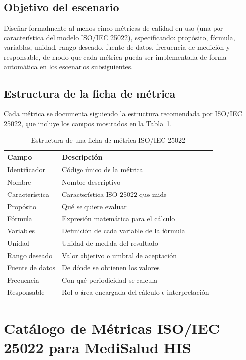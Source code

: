 \documentclass[12pt,a4paper]{article}
\begin{document}
\subsection{Objetivo del escenario}
Dise\~nar formalmente al menos cinco m\'etricas de calidad en uso (una por caracter\'istica del modelo ISO/IEC 25022), especificando: prop\'osito, f\'ormula, variables, unidad, rango deseado, fuente de datos, frecuencia de medici\'on y responsable, de modo que cada m\'etrica pueda ser implementada de forma autom\'atica en los escenarios subsiguientes.

\subsection{Estructura de la ficha de m\'etrica}
Cada m\'etrica se documenta siguiendo la estructura recomendada por ISO/IEC 25022, que incluye los campos mostrados en la Tabla~1.

\begin{table}[H]
\centering
\caption{Estructura de una ficha de m\'etrica ISO/IEC 25022}
\begin{tabularx}{\textwidth}{l X}
\toprule
\textbf{Campo} & \textbf{Descripci\'on} \\
\midrule
Identificador & C\'odigo \'unico de la m\'etrica \\
Nombre & Nombre descriptivo \\
Caracter\'istica & Caracter\'istica ISO 25022 que mide \\
Prop\'osito & Qu\'e se quiere evaluar \\
F\'ormula & Expresi\'on matem\'atica para el c\'alculo \\
Variables & Definici\'on de cada variable de la f\'ormula \\
Unidad & Unidad de medida del resultado \\
Rango deseado & Valor objetivo o umbral de aceptaci\'on \\
Fuente de datos & De d\'onde se obtienen los valores \\
Frecuencia & Con qu\'e periodicidad se calcula \\
Responsable & Rol o \'area encargada del c\'alculo e interpretaci\'on \\
\bottomrule
\end{tabularx}
\end{table}

\section{Cat\'alogo de M\'etricas ISO/IEC 25022 para MediSalud HIS}
\end{document}
